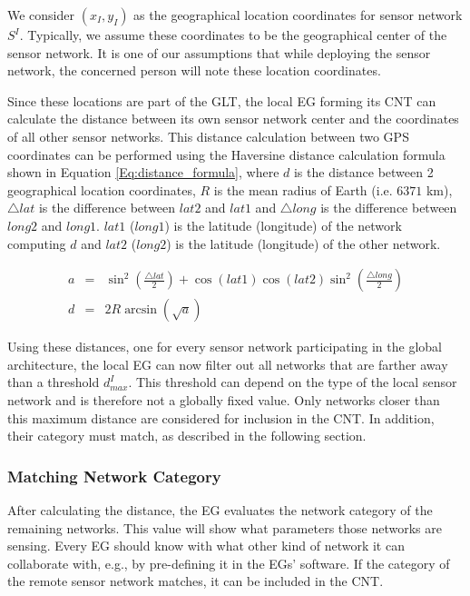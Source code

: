 \documentclass[onecolumn]{jaise2e}
\begin{document}
We consider $(x_I,y_I)$ as the geographical location coordinates for sensor network $S^I$. Typically, we assume these coordinates to be the geographical center of the sensor network. It is one of our assumptions that while deploying the sensor network, the concerned person will note these location coordinates.

Since these locations are part of the GLT, the local EG forming its CNT can calculate the distance between its own sensor network center and the coordinates of all other sensor networks. This distance calculation between two GPS coordinates can be performed using the Haversine distance calculation formula shown in Equation \ref{Eq:distance_formula}, where $d$ is the distance between 2 geographical location coordinates, $R$ is the mean radius of Earth (i.e. $6371$ km), ${\bigtriangleup lat}$ is the difference between $lat2$ and $lat1$ and ${\bigtriangleup long}$ is the difference between $long2$ and $long1$. $lat1$ ($long1$) is the latitude (longitude) of the network computing $d$ and $lat2$ ($long2$) is the latitude (longitude) of the other network.

\begin{figure*}[t]
\begin{eqnarray}\label{Eq:distance_formula}
a & = & \sin^{2}\left(\frac{\bigtriangleup lat}{2}\right) + \cos({lat1})\cos({lat2})\sin ^{2}\left(\frac{\bigtriangleup long}{2}\right) \\
d & = & 2 R \arcsin{\left(\sqrt{a}\right)} \nonumber
\end{eqnarray}
\end{figure*}

Using these distances, one for every sensor network participating in the global architecture, the local EG can now filter out all networks that are farther away than a threshold $d^I_{max}$. This threshold can depend on the type of the local sensor network and is therefore not a globally fixed value. Only networks closer than this maximum distance are considered for inclusion in the CNT. In addition, their category must match, as described in the following section.

\subsubsection{Matching Network Category}

After calculating the distance, the EG evaluates the network category of the remaining networks. This value will show what parameters those networks are sensing. Every EG should know with what other kind of network it can collaborate with, e.g., by pre-defining it in the EGs' software. If the category of the remote sensor network matches, it can be included in the CNT.
\end{document}
